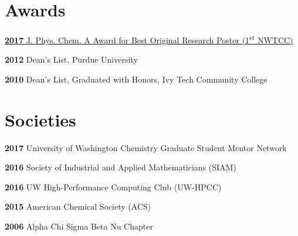 \documentclass[letterpaper]{deedy-resume} %
\begin{document}
\begin{minipage}[t]{0.65\textwidth}
\section{Awards} 
\sectionspace
\begin{tightitemize}
\item \href{https://www.newswise.com/doescience/?article_id=684936&returnurl=aHR0cHM6Ly93d3cubmV3c3dpc2UuY29tL2FydGljbGVzL2xpc3Q=}{\textbf{2017} J. Phys. Chem. A Award for Best Original Research Poster (1\textsuperscript{st} NWTCC) }
\item \textbf{2012} Dean's List, Purdue University
\item \textbf{2010} Dean's List, Graduated with Honors, Ivy Tech Community College
\end{tightitemize}

\section{Societies} 
\sectionspace
\begin{tightitemize}
\item \textbf{2017} University of Washington Chemistry Graduate Student Mentor Network
\item \textbf{2016} Society of Industrial and Applied Mathematicians (SIAM)
\item \textbf{2016} UW High-Performance Computing Club (UW-HPCC)
\item \textbf{2015} American Chemical Society (ACS)
\item \textbf{2006} Alpha Chi Sigma Beta Nu Chapter
\end{tightitemize}
\end{minipage} %
\end{document}
